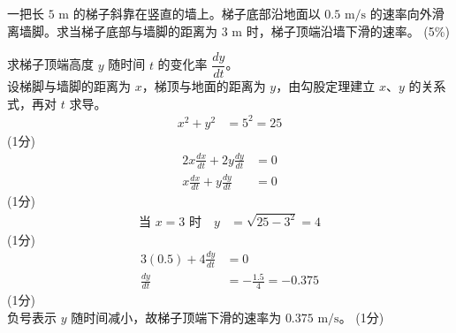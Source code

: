 \documentclass[12pt,a4paper]{exam-zh}
\begin{document}
\begin{question}[points = 5]
    一把长 $5\text{ m}$ 的梯子斜靠在竖直的墙上。梯子底部沿地面以 $0.5\text{ m/s}$ 的速率向外滑离墙脚。求当梯子底部与墙脚的距离为 $3\text{ m}$ 时，梯子顶端沿墙下滑的速率。
    \hfill (5\%)
\end{question}

\begin{solution}
    求梯子顶端高度 $y$ 随时间 $t$ 的变化率 $\dfrac{dy}{dt}$。 \\
    设梯脚与墙脚的距离为 $x$，梯顶与地面的距离为 $y$，由勾股定理建立 $x$、$y$ 的关系式，再对 $t$ 求导。
    \begin{align*}
        x^2+y^2 &= 5^2 = 25
    \end{align*}
    \hfill (1分) \\
    \begin{align*}
        2x\frac{dx}{dt}+2y\frac{dy}{dt} &= 0 \\
        x\frac{dx}{dt}+y\frac{dy}{dt} &= 0
    \end{align*}
    \hfill (1分) \\
    \begin{align*}
        \text{当 } x=3 \text{ 时} \quad y &= \sqrt{25-3^2} = 4
    \end{align*}
    \hfill (1分) \\
    \begin{align*}
        3(0.5)+4\frac{dy}{dt} &= 0 \\
        \frac{dy}{dt} &= -\frac{1.5}{4} = -0.375
    \end{align*}
    \hfill (1分) \\
    负号表示 $y$ 随时间减小，故梯子顶端下滑的速率为 $0.375\text{ m/s}$。
    \hfill (1分)
\end{solution}
\end{document}
